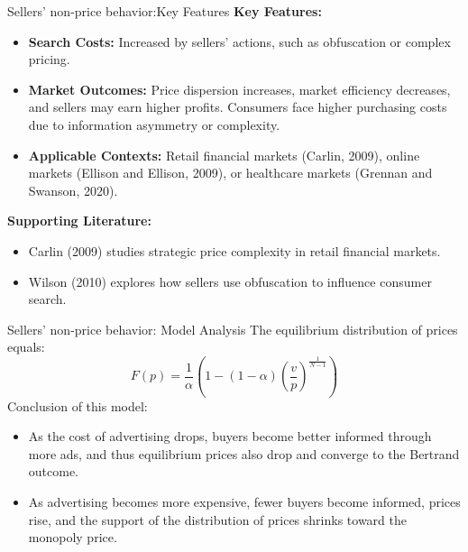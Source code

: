 \documentclass[aspectratio=169]{beamer}  %
\begin{document}
\begin{frame}{Sellers’ non-price behavior:Key Features}
    \textbf{Key Features:}
    \begin{itemize}
        \item \textbf{Search Costs:} Increased by sellers’ actions, such as obfuscation or complex pricing.
        \item \textbf{Market Outcomes:} Price dispersion increases, market efficiency decreases, and sellers may earn higher profits. Consumers face higher purchasing costs due to information asymmetry or complexity.
        \item \textbf{Applicable Contexts:} Retail financial markets (Carlin, 2009), online markets (Ellison and Ellison, 2009), or healthcare markets (Grennan and Swanson, 2020).
    \end{itemize}
    \textbf{Supporting Literature:}
    \begin{itemize}
        \item Carlin (2009) studies strategic price complexity in retail financial markets.
        \item Wilson (2010) explores how sellers use obfuscation to influence consumer search.
    \end{itemize}
\end{frame}

\begin{frame}{Sellers’ non-price behavior: Model Analysis}
    The equilibrium distribution of prices equals:
    $$ 
    F(p) = \frac{1}{\alpha}  \left( 1-(1-\alpha)\left( \frac{v}{p} \right) ^{\frac{1}{N-1}}\right) 
    $$
    Conclusion of this model:
    \begin{itemize}
        \item As the cost of advertising drops, buyers become better informed through more ads, and thus equilibrium prices also drop and converge to the Bertrand outcome.
        \item As advertising becomes more expensive, fewer buyers become informed, prices rise, and the support of the distribution of prices shrinks toward the monopoly price.
    \end{itemize}
\end{frame}
\end{document}
